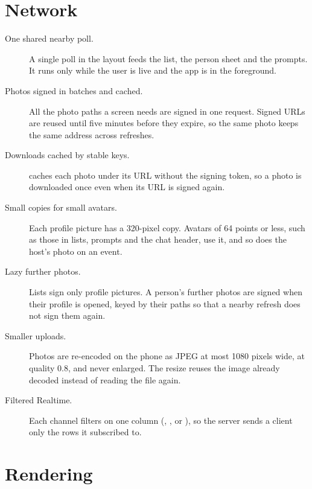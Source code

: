 \section{Network}

\begin{description}
  \item[One shared nearby poll.] A single poll in the  layout feeds the list, the person sheet
    and the prompts. It runs only while the user is live and the app is in the foreground.
  \item[Photos signed in batches and cached.] All the photo paths a screen needs are signed in one
    request. Signed URLs are reused until five minutes before they expire, so the same photo keeps the same
    address across refreshes.
  \item[Downloads cached by stable keys.]  caches each photo under its URL without the
    signing token, so a photo is downloaded once even when its URL is signed again.
  \item[Small copies for small avatars.] Each profile picture has a 320-pixel copy. Avatars of 64 points
    or less, such as those in lists, prompts and the chat header, use it, and so does the host's photo
    on an event.
  \item[Lazy further photos.] Lists sign only profile pictures. A person's further photos are signed when
    their profile is opened, keyed by their paths so that a nearby refresh does not sign them again.
  \item[Smaller uploads.] Photos are re-encoded on the phone as JPEG at most 1080 pixels wide, at quality
    0.8, and never enlarged. The resize reuses the image already decoded instead of reading the file again.
  \item[Filtered Realtime.] Each channel filters on one column (, ,
     or ), so the server sends a client only the rows it subscribed to.
\end{description}

\section{Rendering}

